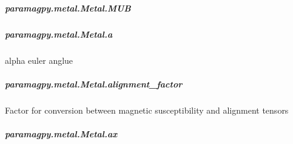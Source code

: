 \documentclass[a4paper,10pt,english,openany,oneside]{sphinxmanual}
\begin{document}
\begin{fulllineitems}
\begin{fulllineitems}
\subparagraph{paramagpy.metal.Metal.MUB}
\label{\detokenize{reference/generated/paramagpy.metal.Metal.MUB:paramagpy-metal-metal-mub}}\label{\detokenize{reference/generated/paramagpy.metal.Metal.MUB::doc}}

\begin{fulllineitems}
\label{\detokenize{reference/generated/paramagpy.metal.Metal.MUB:paramagpy.metal.Metal.MUB}}
\end{fulllineitems}



\subparagraph{paramagpy.metal.Metal.a}
\label{\detokenize{reference/generated/paramagpy.metal.Metal.a:paramagpy-metal-metal-a}}\label{\detokenize{reference/generated/paramagpy.metal.Metal.a::doc}}

\begin{fulllineitems}
\label{\detokenize{reference/generated/paramagpy.metal.Metal.a:paramagpy.metal.Metal.a}}
alpha euler anglue

\end{fulllineitems}



\subparagraph{paramagpy.metal.Metal.alignment\_factor}
\label{\detokenize{reference/generated/paramagpy.metal.Metal.alignment_factor:paramagpy-metal-metal-alignment-factor}}\label{\detokenize{reference/generated/paramagpy.metal.Metal.alignment_factor::doc}}

\begin{fulllineitems}
\label{\detokenize{reference/generated/paramagpy.metal.Metal.alignment_factor:paramagpy.metal.Metal.alignment_factor}}
Factor for conversion between magnetic susceptibility
and alignment tensors

\end{fulllineitems}



\subparagraph{paramagpy.metal.Metal.ax}
\label{\detokenize{reference/generated/paramagpy.metal.Metal.ax:paramagpy-metal-metal-ax}}\label{\detokenize{reference/generated/paramagpy.metal.Metal.ax::doc}}


\end{fulllineitems}
\end{fulllineitems}
\end{document}
